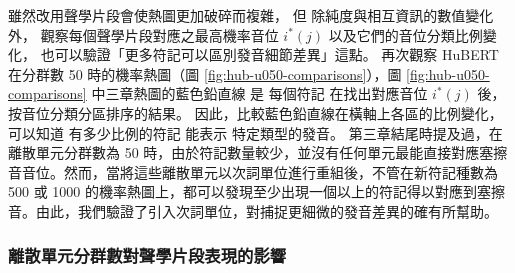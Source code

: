 {        雖然改用聲學片段會使熱圖更加破碎而複雜，
但
除純度與相互資訊的數值變化外，
觀察每個聲學片段對應之最高機率音位 $i^*(j)$ 以及它們的音位分類比例變化，
也可以驗證「更多符記可以區別發音細節差異」這點。
再次觀察 HuBERT 在分群數 50 時的機率熱圖（圖 \ref{fig:hub-u050-comparisons}），圖 \ref{fig:hub-u050-comparisons} 中三章熱圖的藍色鉛直線
是
每個符記
在找出對應音位 $i^*(j)$ 後，按音位分類分區排序的結果。
因此，比較藍色鉛直線在橫軸上各區的比例變化，
可以知道
有多少比例的符記
能表示
特定類型的發音。
第三章結尾時提及過，在離散單元分群數為 50 時，由於符記數量較少，並沒有任何單元最能直接對應塞擦音音位。然而，當將這些離散單元以次詞單位進行重組後，不管在新符記種數為 500 或 1000 的機率熱圖上，都可以發現至少出現一個以上的符記得以對應到塞擦音。由此，我們驗證了引入次詞單位，對捕捉更細微的發音差異的確有所幫助。

\subsubsection{離散單元分群數對聲學片段表現的影響}

}
